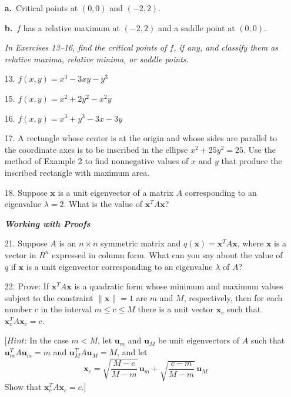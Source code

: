 \documentclass{article}
\begin{document}
\begin{enumerate}
\textbf{a.}\ Critical points at $(0,0)$ and $(-2,2)$.

\textbf{b.}\ $f$ has a relative maximum at $(-2,2)$ and a saddle point at $(0,0)$.

\noindent\textit{In Exercises 13--16, find the critical points of $f$, if any, and classify
them as relative maxima, relative minima, or saddle points.}

\item[13.] $f(x,y) = x^3-3xy-y^3$

\item[15.] $f(x,y) = x^2+2y^2-x^2y$

\item[16.] $f(x,y) = x^3+y^3-3x-3y$

\item[17.] A rectangle whose center is at the origin and whose sides are parallel to the
coordinate axes is to be inscribed in the ellipse $x^2+25y^2=25$. Use the method of
Example 2 to find nonneg\-ative values of $x$ and $y$ that produce the inscribed rectangle
with maximum area.

\item[18.] Suppose $\mathbf{x}$ is a unit eigenvector of a matrix $A$ corresponding to an
eigenvalue $\lambda=2$. What is the value of $\mathbf{x}^T A\mathbf{x}$?

\noindent\textit{\textbf{Working with Proofs}}

\item[21.] Suppose $A$ is an $n\times n$ symmetric matrix and $q(\mathbf{x})=\mathbf{x}^T A\mathbf{x}$,
where $\mathbf{x}$ is a vector in $R^n$ expressed in column form. What can you say about
the value of $q$ if $\mathbf{x}$ is a unit eigenvector corresponding to an eigenvalue
$\lambda$ of $A$?

\item[22.] Prove: If $\mathbf{x}^T A\mathbf{x}$ is a quadratic form whose minimum and maximum
values subject to the constraint $\|\mathbf{x}\|=1$ are $m$ and $M$, respectively, then for
each number $c$ in the interval $m\le c\le M$ there is a unit vector $\mathbf{x}_c$ such
that $\mathbf{x}_c^T A\mathbf{x}_c=c$.

[$Hint$: In the case $m<M$, let $\mathbf{u}_m$ and $\mathbf{u}_M$ be unit eigenvectors of
$A$ such that $\mathbf{u}_m^T A\mathbf{u}_m=m$ and $\mathbf{u}_M^T A\mathbf{u}_M=M$, and let
\[
  \mathbf{x}_c = \sqrt{\frac{M-c}{M-m}}\,\mathbf{u}_m + \sqrt{\frac{c-m}{M-m}}\,\mathbf{u}_M
\]
Show that $\mathbf{x}_c^T A\mathbf{x}_c=c$.]

\end{enumerate}
\end{document}
